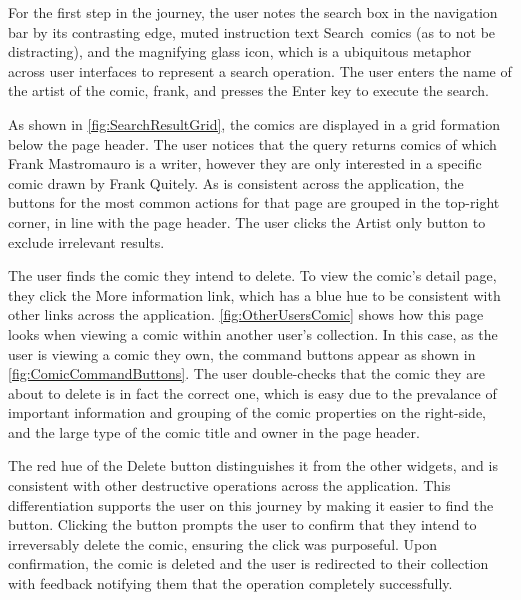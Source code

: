 \documentclass[fontsize=12pt,a4paper]{scrreprt}
\begin{document}
For the first step in the journey, the user notes the search box in the navigation bar by its contrasting edge, muted instruction text \textsf{Search~comics} (as to not be distracting), and the magnifying glass icon, which is a ubiquitous metaphor across user interfaces to represent a search operation. The user enters the name of the artist of the comic, \textsf{frank}, and presses the \textsf{Enter} key to execute the search.

As shown in \autoref{fig:SearchResultGrid}, the comics are displayed in a grid formation below the page header. The user notices that the query returns comics of which \textsf{Frank Mastromauro} is a writer, however they are only interested in a specific comic drawn by \textsf{Frank Quitely}. As is consistent across the application, the buttons for the most common actions for that page are grouped in the top-right corner, in line with the page header. The user clicks the \textsf{Artist only} button to exclude irrelevant results.

The user finds the comic they intend to delete. To view the comic's detail page, they click the \textsf{More information} link, which has a blue hue to be consistent with other links across the application. \autoref{fig:OtherUsersComic} shows how this page looks when viewing a comic within another user's collection. In this case, as the user is viewing a comic they own, the command buttons appear as shown in \autoref{fig:ComicCommandButtons}. The user double-checks that the comic they are about to delete is in fact the correct one, which is easy due to the prevalance of important information and grouping of the comic properties on the right-side, and the large type of the comic title and owner in the page header.

The red hue of the \textsf{Delete} button distinguishes it from the other widgets, and is consistent with other destructive operations across the application. This differentiation supports the user on this journey by making it easier to find the button. Clicking the button prompts the user to confirm that they intend to irreversably delete the comic, ensuring the click was purposeful. Upon confirmation, the comic is deleted and the user is redirected to their collection with feedback notifying them that the operation completely successfully.
\end{document}
